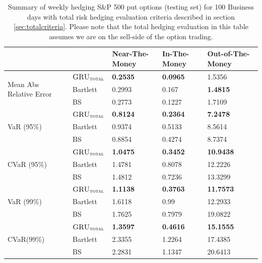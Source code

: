 \documentclass[letterpaper,12pt,titlepage,oneside,final]{book}
\numberwithin{equation}{section}
\theoremstyle{definition}
\newcommand{\modelT}{\textsc{GRU}_{\textsc{total}}}
\begin{document}
\begin{table}[htp!]
	\centering
	\begin{tabular}{ll|l|l|l|}
		\cline{3-5}
		&          & Near-The-Money   & In-The-Money     & Out-of-The-Money  \\ \hline
		\multicolumn{1}{|l|}{\multirow{3}{*}{Mean Abs Relative Error}} & $\modelT$    & \textbf{0.2535}           & \textbf{0.0965}  & 1.5356   \\ 
		\multicolumn{1}{|l|}{}                                & Bartlett     & 0.2993 			& 0.167  		   & \textbf{1.4815}       \\ 
		\multicolumn{1}{|l|}{}                                & BS       	 & 0.2773 		    & 0.1227 		   & 1.7109            \\ 
		\hline
		\multicolumn{1}{|l|}{\multirow{3}{*}{VaR (95\%)}}     & $\modelT$    & \textbf{0.8124} & \textbf{0.2364} & \textbf{7.2478}  \\ 
		\multicolumn{1}{|l|}{}                                & Bartlett 	 & 0.9374 			& 0.5133 		   &8.5614           \\  
		\multicolumn{1}{|l|}{}                                & BS       	 & 0.8854 			& 0.4274 		   &8.7374           \\ 
		\hline
		\multicolumn{1}{|l|}{\multirow{3}{*}{CVaR (95\%)}}    & $\modelT$    & \textbf{1.0475} & \textbf{0.3452} & \textbf{10.9438} \\ 
		\multicolumn{1}{|l|}{}                                & Bartlett 	 & 1.4781  		&0.8078 		   &12.2226          \\  
		\multicolumn{1}{|l|}{}                                & BS       	 &  1.4812  		&0.7236 		   &13.3299          \\ 
		\hline
		\multicolumn{1}{|l|}{\multirow{3}{*}{VaR (99\%)}}     & $\modelT$    & \textbf{1.1138} & \textbf{0.3763} & \textbf{11.7573} \\  
		\multicolumn{1}{|l|}{}                                & Bartlett 	 & 1.6118  		 &0.99   		   &12.2933         \\  
		\multicolumn{1}{|l|}{}                                & BS       	 & 1.7625  		&0.7979 		   &19.0822          \\ 
		\hline
		\multicolumn{1}{|l|}{\multirow{3}{*}{CVaR(99\%)}}     & $\modelT$    & \textbf{1.3597} & \textbf{0.4616} & \textbf{15.1555} \\  
		\multicolumn{1}{|l|}{}                                & Bartlett     &2.3355  			&1.2264 		   &17.4385          \\ 
		\multicolumn{1}{|l|}{}                                & BS       	 & 2.2831  		&1.1347 		   &20.6413          \\ \hline
	\end{tabular}
	\caption{Summary of weekly hedging S\&P 500 put options (testing set) for 100 Business days with total risk hedging evaluation criteria described in section \ref{sec:totalcriteria}. Please note that the total hedging evaluation in this table assumes we are on the sell-side of the option trading.} \label{table:putTotalW}
\end{table}
\end{document}

